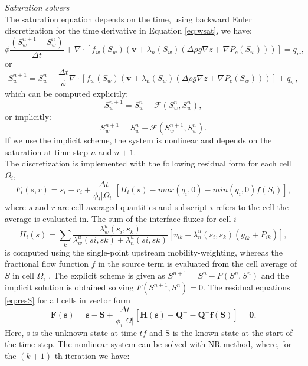 \documentclass[12pt]{article}
\begin{document}
\emph{Saturation solvers}\\
The saturation equation depends on the time, using backward Euler discretization for the time derivative in Equation \ref{eq:wsat}, we have:
\begin{equation}\label{eq:wsat1}
 \phi\frac{( {S}_{w}^{n+1}-{S}_{w}^n)}{\Delta t}+\nabla \cdot [f_w({S}_{w})( \mathbf{v}+\lambda_n({S}_{w})(\Delta  \rho g\nabla z+\nabla P_c({S}_{w})))]= q_w,
\end{equation}
or
\begin{equation*}\label{eq:wsat2}
 {S}_{w}^{n+1}={S}_{w}^n-\frac{\Delta t}{\phi}\nabla \cdot [f_w({S}_{w})( \mathbf{v}+\lambda_n({S}_{w})(\Delta  \rho g\nabla z+\nabla P_c({S}_{w})))]+q_w,
\end{equation*}
which can be computed explicitly:
\begin{equation*}\label{eq:wsat3}
 {S}_{w}^{n+1}={S}_{w}^n-\mathcal{F}({S}_{w}^{n},{S}_{w}^{n}),
\end{equation*}
or implicitly:
\begin{equation*}\label{eq:wsat4}
 {S}_{w}^{n+1}={S}_{w}^n-\mathcal{F}({S}_{w}^{n+1},{S}_{w}^{n}).
\end{equation*}
If we use the implicit scheme, the system is nonlinear and depends on the saturation at time step $n$ and $n+1$.\\
The discretization is implemented with the following residual form for each cell $\Omega_i$,
\begin{equation}\label{eq:resS}
 F_i (s, r) = s_i − r_i +\frac{\Delta t}{\phi_i|\Omega_i|}[H_i (s) − max(q_i, 0) − min(q_i , 0)f (S_i )],
\end{equation}
where $s$ and $r$ are cell-averaged quantities and subscript $i$ refers to
the cell the average is evaluated in. The sum of the interface fluxes for cell $i$ 
\begin{equation}
 H_i (s) =\sum_k \frac{\lambda^u_w (s_i , s_k )}{\lambda^u_w (si , sk ) + \lambda^u_n (si , sk )}[v_{ik} + \lambda^u_n (s_i , s_k )(g_{ik} + P_{ik} )],
\end{equation}
is computed using the single-point upstream mobility-weighting, whereas the fractional flow function $f$ in the source term
is evaluated from the cell average of $S$ in cell $\Omega_i$ . The explicit scheme is given
as $S^{n+1} = S^n −F(S^n , S^n )$ and the implicit solution is obtained solving $F(S^{n+1} , S^{ n}) = 0$. 
The residual equations \eqref{eq:resS} for all cells in vector form
\begin{equation}
 \mathbf{F} (\mathbf{s}) = \mathbf{s} − \mathbf{S} +\frac{\Delta t}{\phi_i|\Omega|}[\mathbf{H} (\mathbf{s}) − \mathbf{Q}^+ − \mathbf{Q}^-\mathbf{f} (\mathbf{S} )]=\mathbf{0}.
\end{equation}
Here, s is the unknown state at time $tf$ and S is the known state at the start
of the time step. The nonlinear system can be solved with NR method, where, for the $(k+1)$-th iteration we have:
\end{document}
